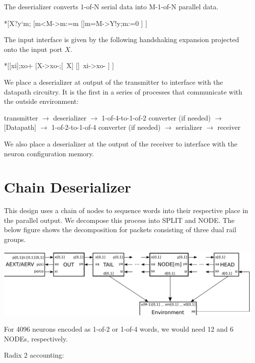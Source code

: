 \documentclass{article}
\begin{document}
The deserializer converts 1-of-N serial data into M-1-of-N parallel data.

\begin{csp}
*[X?y`m;
    [m<M->m:=m
    []m=M->Y!y;m:=0
    ]
 ]
\end{csp}

\noindent
The input interface is given by the following handshaking expansion 
projected onto the input port $X$.

\begin{hse}
*[[xi];xo+
    [X->xo-;[~X]
    []~xi->xo-
    ]
 ]
\end{hse}

We place a deserializer at output of the transmitter to interface with the 
datapath circuitry. It is the first in a series of processes that communicate 
with the outside environment:

\noindent
transmitter $\rightarrow$
deserializer $\rightarrow$
1-of-4-to-1-of-2 converter (if needed) $\rightarrow$
[Datapath] $\rightarrow$
1-of-2-to-1-of-4 converter (if needed) $\rightarrow$
serializer $\rightarrow$
receiver

\noindent
We also place a deserializer at the output of the receiver to interface with the
neuron configuration memory.


\section{Chain Deserializer \label{sec:DESERIAL_CHAIN}}

This design uses a chain of nodes to sequence words into their respective place
in the parallel output. We decompose this process into SPLIT and NODE.
The below figure shows the decomposition for packets consisting of three
dual rail groups.

\begin{center}
  \includegraphics[width=.5\textwidth]{img/deserial_chain.pdf}
\end{center}

\noindent
For 4096 neurons encoded as 1-of-2 or 1-of-4 words, we would need 12 and 6 NODEs,
respectively.

\noindent
Radix 2 accounting:
\end{document}
